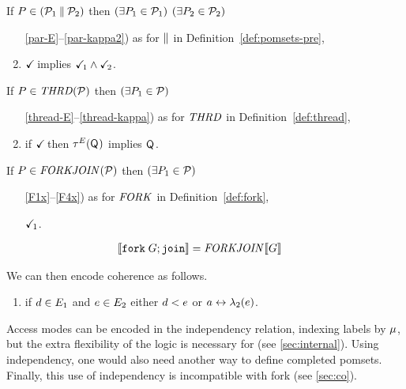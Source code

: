 \begin{definition}$\phantom{\;}$\par

  \noindent
  If $P \in (\mathcal{P}_1\mathbin{\parallel}\mathcal{P}_2)$ then
  $(\exists P_1\in\mathcal{P}_1)$ $(\exists P_2\in\mathcal{P}_2)$
  \begin{enumerate}
    \setcounter{enumi}{\value{pomsetPreParCount}}
  \item[\ref{par-E}--\ref{par-kappa2})]
    as for $\mathbin{\parallel}$ in Definition~\ref{def:pomsets-pre},
  \item \label{par-tick}
    $\checkmark\!$ implies $\checkmark\!_1\land\checkmark\!_2$.
  \end{enumerate}

  \noindent
  If $\aPS \in \sTHREAD{\aPSS}$ then
  $(\exists P_1\in\mathcal{P})$
  \begin{enumerate}
    \setcounter{enumi}{\value{pomsetXThreadCount}}
  \item[\ref{thread-E}--\ref{thread-kappa})]
    as for $\sTHREAD{}$ in Definition~\ref{def:thread},
  \item if $\checkmark\!$ then $\aTr{\aEvs}{\Q{}}$ implies $\mathsf{Q}_{}$.
  \end{enumerate}    

  \noindent
  If $\aPS \in \sFORKJOIN{\aPSS}$ then
  $(\exists P_1\in\mathcal{P})$
  \begin{enumerate}
    \setcounter{enumi}{\value{pomsetXForkCount}}
  \item[\ref{F1x}--\ref{F4x})]
    as for $\sFORK{}$ in Definition~\ref{def:fork},
  \item[{\labeltext[F5]{F5)}{F5}}]
    $\checkmark\!_1$.
  \end{enumerate}    
\end{definition}

\begin{align*}
  \sem{\FORKJOIN{\aGrp}} &= \sFORKJOIN{}\sem{\aGrp}  
\end{align*}

We can then encode coherence as follows.
\begin{enumerate}
  \setcounter{enumi}{\value{pomsetXSemiCount}}
\item if $d\in E_1$ and $e\in E_2$ either $d<e$ or $a\mathrel\leftrightarrow\lambda_2(e)$.
\end{enumerate}


Access modes can be encoded in the independency relation, indexing labels by
$\mu$, but the extra flexibility of the logic is necessary for \armeight{}
(see \textsection\ref{sec:internal}).  Using independency, one would also
need another way to define completed pomsets.  Finally, this use of
independency is incompatible with fork (see \textsection\ref{sec:co}).


